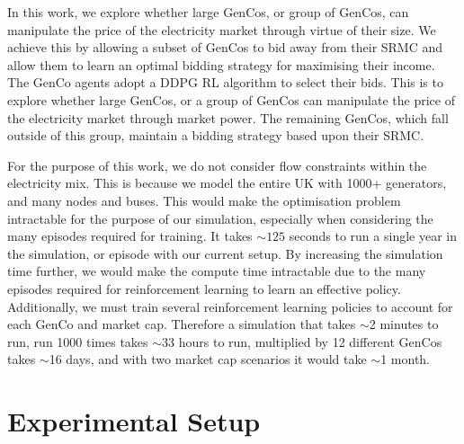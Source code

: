 In this work, we explore whether large GenCos, or group of GenCos, can manipulate the price of the electricity market through virtue of their size. We achieve this by allowing a subset of GenCos to bid away from their SRMC and allow them to learn an optimal bidding strategy for maximising their income. The GenCo agents adopt a DDPG RL algorithm to select their bids. This is to explore whether large GenCos, or a group of GenCos can manipulate the price of the electricity market through market power. The remaining GenCos, which fall outside of this group, maintain a bidding strategy based upon their SRMC.

For the purpose of this work, we do not consider flow constraints within the electricity mix. This is because we model the entire UK with 1000+ generators, and many nodes and buses. This would make the optimisation problem intractable for the purpose of our simulation, especially when considering the many episodes required for training. It takes ${\sim}125$ seconds to run a single year in the simulation, or episode with our current setup. By increasing the simulation time further, we would make the compute time intractable due to the many episodes required for reinforcement learning to learn an effective policy. Additionally, we must train several reinforcement learning policies to account for each GenCo and market cap. Therefore a simulation that takes ${\sim}$2 minutes to run, run 1000 times takes ${\sim}$33 hours to run, multiplied by 12 different GenCos takes ${\sim}$16 days, and with two market cap scenarios it would take ${\sim}$1 month.









\section{Experimental Setup}
\label{rl:sec:methodology}


